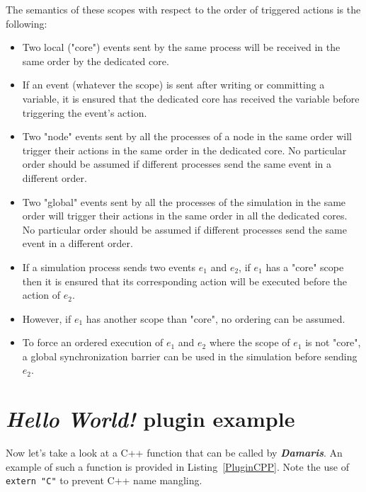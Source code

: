 \documentclass[11pt]{report}
\newcommand{\Damaris}{\emph{\textbf{Damaris}}}
\begin{document}
\noindent\begin{minipage}{\textwidth}
\vspace{0.5cm}

\end{minipage}

The semantics of these scopes with respect to the order of triggered actions is the following:
\begin{itemize}
\item Two local ("core") events sent by the same process will be received in the same order by the dedicated core.
\item If an event (whatever the scope) is sent after writing or committing a variable, it is ensured that the
dedicated core has received the variable before triggering the event's action.
\item Two "node" events sent by all the processes of a node in the same order will trigger their actions in
the same order in the dedicated core. No particular order should be assumed if different processes send the
same event in a different order.
\item Two "global" events sent by all the processes of the simulation in the same order will trigger their actions
in the same order in all the dedicated cores. No particular order should be assumed if different processes send
the same event in a different order.
\item If a simulation process sends two events $e_1$ and $e_2$, if $e_1$ has a "core" scope 
then it is ensured that its corresponding action will be executed before the action of 
$e_2$. 
\item However, if $e_1$ has another scope than "core", no ordering can be assumed.
\item To force an ordered execution of $e_1$ and $e_2$ where the scope of $e_1$ is not "core",
a global synchronization barrier can be used in the simulation before sending $e_2$.
\end{itemize}

\section{\emph{Hello World!} plugin example}

Now let's take a look at a C++ function that can be called by \Damaris{}. An example of such a function
is provided in Listing~\ref{PluginCPP}. Note the use of \texttt{extern "C"} to prevent C++ name mangling.
\end{document}
